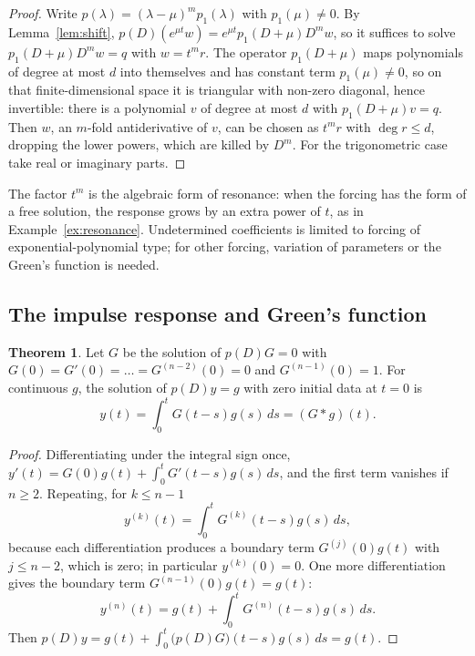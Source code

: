 \documentclass[11pt,a4paper]{article}
\numberwithin{equation}{section}
\theoremstyle{definition}
\newtheorem{thm}{Theorem}[subsection]
\begin{document}
\begin{proof}
Write $p(\lambda) = (\lambda - \mu)^mp_1(\lambda)$ with $p_1(\mu) \neq 0$. By Lemma~\ref{lem:shift}, $p(D)(e^{\mu t}w) = e^{\mu t}p_1(D + \mu)D^mw$, so it suffices to solve $p_1(D + \mu)D^mw = q$ with $w = t^mr$. The operator
$p_1(D + \mu)$ maps polynomials of degree at most $d$ into themselves and has constant term $p_1(\mu) \neq 0$, so on that finite-dimensional space it is triangular with non-zero diagonal, hence
invertible: there is a polynomial $v$ of degree at most $d$ with $p_1(D + \mu)v = q$. Then $w$, an $m$-fold antiderivative of $v$, can be chosen as $t^mr$ with $\deg r \leq d$, dropping the lower
powers, which are killed by $D^m$. For the trigonometric case take real or imaginary parts.
\end{proof}

The factor $t^m$ is the algebraic form of resonance: when the forcing has the form of a free solution, the response grows by an extra power of $t$, as in Example~\ref{ex:resonance}.
Undetermined coefficients is limited to forcing of exponential-polynomial type; for other forcing, variation of parameters or the Green's function is needed.

\subsection{The impulse response and Green's function}
\label{ssec:impulse}

\begin{thm}
\label{thm:impulse}
Let $G$ be the solution of $p(D)G = 0$ with $G(0) = G'(0) = \dots = G^{(n-2)}(0) = 0$ and $G^{(n-1)}(0) = 1$. For continuous $g$, the solution of $p(D)y = g$ with zero initial data at $t = 0$ is
\[
y(t) = \int_0^tG(t - s)g(s)\,ds = (G * g)(t) .
\]
\end{thm}

\begin{proof}
Differentiating under the integral sign once, $y'(t) = G(0)g(t) + \int_0^tG'(t - s)g(s)\,ds$, and the first term vanishes if $n \geq 2$. Repeating, for $k \leq n - 1$
\[
y^{(k)}(t) = \int_0^tG^{(k)}(t - s)g(s)\,ds ,
\]
because each differentiation produces a boundary term $G^{(j)}(0)g(t)$ with $j \leq n - 2$, which is zero; in particular $y^{(k)}(0) = 0$. One more differentiation gives the boundary term
$G^{(n-1)}(0)g(t) = g(t)$:
\[
y^{(n)}(t) = g(t) + \int_0^tG^{(n)}(t - s)g(s)\,ds .
\]
Then $p(D)y = g(t) + \int_0^t\bigl(p(D)G\bigr)(t - s)g(s)\,ds = g(t)$.
\end{proof}
\end{document}
